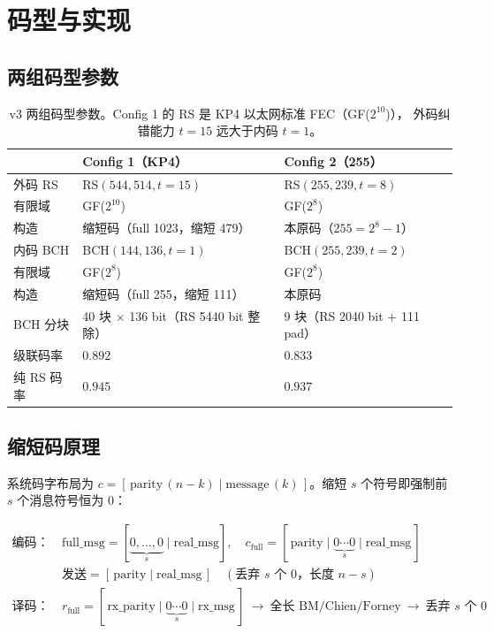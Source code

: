 \documentclass[11pt,a4paper]{article}
\begin{document}
\section{码型与实现}

\subsection{两组码型参数}

\begin{table}[!ht]
\centering
\begin{tabularx}{\textwidth}{lXX}
\toprule
& \textbf{Config 1（KP4）} & \textbf{Config 2（255）} \\
\midrule
外码 RS         & RS$(544,514,t{=}15)$ & RS$(255,239,t{=}8)$ \\
\quad 有限域    & GF($2^{10}$)         & GF($2^{8}$) \\
\quad 构造      & 缩短码（full 1023，缩短 479）& 本原码（$255=2^8{-}1$）\\
内码 BCH        & BCH$(144,136,t{=}1)$ & BCH$(255,239,t{=}2)$ \\
\quad 有限域    & GF($2^{8}$)          & GF($2^{8}$) \\
\quad 构造      & 缩短码（full 255，缩短 111）& 本原码 \\
BCH 分块        & 40 块 $\times$ 136 bit（RS 5440 bit 整除）& 9 块（RS 2040 bit + 111 pad）\\
级联码率        & $0.892$              & $0.833$ \\
纯 RS 码率      & $0.945$              & $0.937$ \\
\bottomrule
\end{tabularx}
\caption{v3 两组码型参数。Config 1 的 RS 是 KP4 以太网标准 FEC（GF($2^{10}$)），
外码纠错能力 $t{=}15$ 远大于内码 $t{=}1$。}
\end{table}

\subsection{缩短码原理}

系统码字布局为 $c=[\,\text{parity}\,(n{-}k)\mid\text{message}\,(k)\,]$。缩短 $s$ 个符号即强制前
$s$ 个消息符号恒为 0：

\begin{align*}
\text{编码：}\quad & \text{full\_msg} = [\underbrace{0,\dots,0}_{s}\mid \text{real\_msg}],\quad
   c_{\text{full}} = [\,\text{parity}\mid \underbrace{0\cdots0}_{s}\mid \text{real\_msg}\,]\\
   & \text{发送} = [\,\text{parity}\mid \text{real\_msg}\,]\quad(\text{丢弃 }s\text{ 个 0，长度 }n{-}s)\\
\text{译码：}\quad & r_{\text{full}} = [\,\text{rx\_parity}\mid \underbrace{0\cdots0}_{s}\mid \text{rx\_msg}\,]\ \to\
   \text{全长 BM/Chien/Forney}\ \to\ \text{丢弃 }s\text{ 个 0}
\end{align*}
\end{document}
